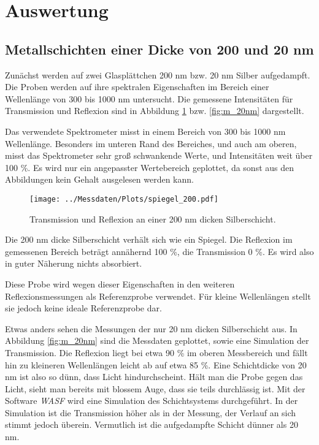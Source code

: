 \documentclass[10pt,twoside]{article}
\renewcommand{\1}{^{-1}}
\renewcommand{\2}{^{-2}}
\newcommand{\3}{^{-3}}
\newcommand{\4}{^{-4}}
\newcommand{\5}{^{-5}}
\newcommand{\6}{^{-6}}
\newcommand{\7}{^{-7}}
\newcommand{\8}{^{-8}}
\newcommand{\9}{^{-9}}
\begin{document}
\newpage

\section{Auswertung}

\subsection{Metallschichten einer Dicke von 200 und 20 nm}

Zunächst werden auf zwei Glasplättchen 200 nm bzw. 20 nm Silber aufgedampft. Die Proben werden auf ihre spektralen Eigenschaften im Bereich einer Wellenlänge von 300 bis 1000 nm untersucht.
Die gemessene Intensitäten für Transmission und Reflexion sind in Abbildung \ref{fig:spiegel} bzw. \ref{fig:m_20nm} dargestellt.

Das verwendete Spektrometer misst in einem Bereich von 300 bis 1000 nm Wellenlänge. Besonders im unteren Rand des Bereiches, und auch am oberen, misst das Spektrometer sehr groß schwankende Werte, und Intensitäten weit über 100 \%.
Es wird nur ein angepasster Wertebereich geplottet, da sonst aus den Abbildungen kein Gehalt ausgelesen werden kann.
\begin{figure}[H]
\centering
\texttt{[image: ../Messdaten/Plots/spiegel\_200.pdf]} 
\caption{Transmission und Reflexion an einer 200 nm dicken Silberschicht.}
\label{fig:spiegel}
\end{figure}
Die 200 nm dicke Silberschicht verhält sich wie ein Spiegel. Die Reflexion im gemessenen Bereich beträgt annähernd 100 \%, die Transmission 0 \%. Es wird also in guter Näherung nichts absorbiert.

Diese Probe wird wegen dieser Eigenschaften in den weiteren Reflexionsmessungen als Referenzprobe verwendet. Für kleine Wellenlängen stellt sie jedoch keine ideale Referenzprobe dar.

Etwas anders sehen die Messungen der nur 20 nm dicken Silberschicht aus. In Abbildung \ref{fig:m_20nm} sind die Messdaten geplottet, sowie eine Simulation der Transmission.
Die Reflexion liegt bei etwa 90 \% im oberen Messbereich und fällt hin zu kleineren Wellenlängen leicht ab auf etwa 85 \%.
Eine Schichtdicke von 20 nm ist also so dünn, dass Licht hindurchscheint. Hält man die Probe gegen das Licht, sieht man bereits mit blossem Auge, dass sie teils durchlässig ist.
Mit der Software \textit{WASF} wird eine Simulation des Schichtsystems durchgeführt.
In der Simulation ist die Transmission höher als in der Messung, der Verlauf an sich stimmt jedoch überein.
Vermutlich ist die aufgedampfte Schicht dünner als 20 nm.
\end{document}
